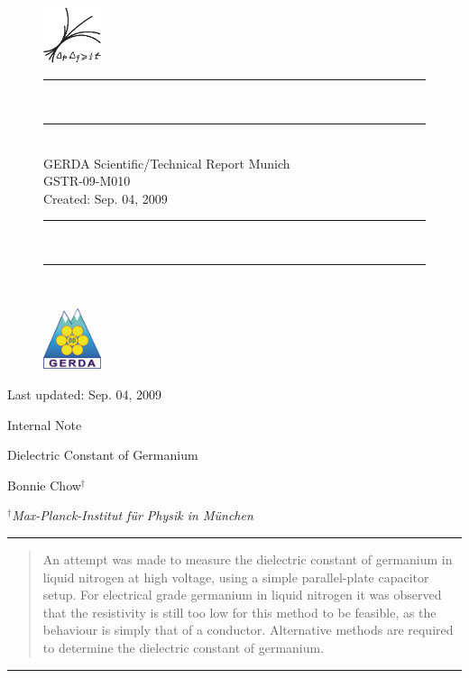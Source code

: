 \documentclass[a4paper,11pt]{article}
\begin{document}
\begin{titlepage}\centering

\begin{figure}[t!]\centering
  \includegraphics[width=0.15\textwidth]{logoMPPMU}\hfil
  \begin{minipage}[b]{0.5\linewidth}\centering
    \rule[-4.2mm]{\textwidth}{0.3mm}\\\rule{0.98\textwidth}{0.1mm}\\
    GERDA Scientific/Technical Report Munich\\\vspace{2mm}
    GSTR-09-M010 \\\vspace{2mm}
    Created: Sep. 04, 2009\\\vspace{-7.5mm}
    \rule[-5mm]{0.98\textwidth}{0.1mm}\\\rule{\textwidth}{0.3mm}\\
  \end{minipage}\hfil
  \includegraphics[width=0.15\textwidth]{logoGERDA}%
\end{figure}

\begin{flushright}
Last updated: Sep. 04, 2009
\end{flushright}
\vspace{0.5cm}

\Large{Internal Note}
\vspace{1cm}

\LARGE{Dielectric Constant of Germanium}
\vspace{1cm}

\Large{Bonnie Chow$^{\dagger}$}
\vspace{0.5cm} 

\normalsize{$^{\dagger}$\textit{Max-Planck-Institut f\"ur Physik in M\"unchen}}
\vspace{0.5cm} 

\rule{0.9\textwidth}{0.1mm}
\begin{abstract}
 An attempt was made to measure the dielectric constant of germanium in liquid 
 nitrogen at high voltage, using a simple parallel-plate capacitor setup. For 
 electrical grade germanium in liquid nitrogen it was observed that the 
 resistivity is still too low for this method to be feasible, as the behaviour 
 is simply that of a conductor. Alternative methods are required to  determine 
 the dielectric constant of germanium.
\end{abstract}
\rule{0.9\textwidth}{0.1mm}

\end{titlepage} 
\end{document}
